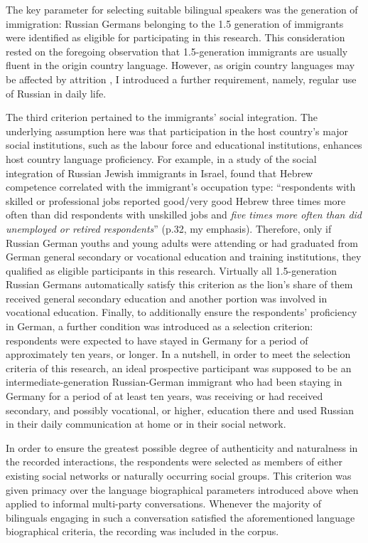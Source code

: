 The key parameter for selecting suitable bilingual speakers was the generation of immigration: Russian Germans belonging to the 1.5 generation of immigrants were identified as eligible for participating in this research. This consideration rested on the foregoing observation that 1.5-generation immigrants are usually fluent in the origin country language. However, as origin country languages may be affected by attrition \citep[on the development of Russian in Russian-German immigrants of the 1.5 generation, see][]{meng01,meng-protas}, I introduced a further requirement, namely, regular use of Russian in daily life. 

The third criterion pertained to the immigrants' social integration. The underlying assumption here was that participation in the host country's major social institutions, such as the labour force and educational institutions, enhances host country language proficiency. For example, in a study of the social integration of Russian Jewish immigrants in Israel, \citet{remennick03} found that Hebrew competence correlated with the immigrant's occupation type: ``respondents with skilled or professional jobs reported good/very good Hebrew three times more often than did respondents with unskilled jobs and \textit{five times more often than did unemployed or retired respondents}'' (p.32, my emphasis). Therefore, only if Russian German youths and young adults were attending or had graduated from German general secondary or vocational education and training institutions, they qualified as eligible participants in this research. Virtually all 1.5-generation Russian Germans automatically satisfy this criterion as the lion's share of them received general secondary education and another portion was involved in vocational education. Finally, to additionally ensure the respondents' proficiency in German, a further condition was introduced as a selection criterion: respondents were expected to have stayed in Germany for a period of approximately ten years, or longer. In a nutshell, in order to meet the selection criteria of this research, an ideal prospective participant was supposed to be an intermediate-generation Russian-German immigrant who had been staying in Germany for a period of at least ten years, was receiving or had received secondary, and possibly vocational, or higher, education there and used Russian in their daily communication at home or in their social network. 

In order to ensure the greatest possible degree of authenticity and naturalness in the recorded interactions, the respondents were selected as members of either existing social networks or naturally occurring social groups. 
This criterion was given primacy over the language biographical parameters introduced above when applied to informal multi-party conversations. Whenever the majority of bilinguals engaging in such a conversation satisfied the aforementioned language biographical criteria, the recording was included in the corpus.

